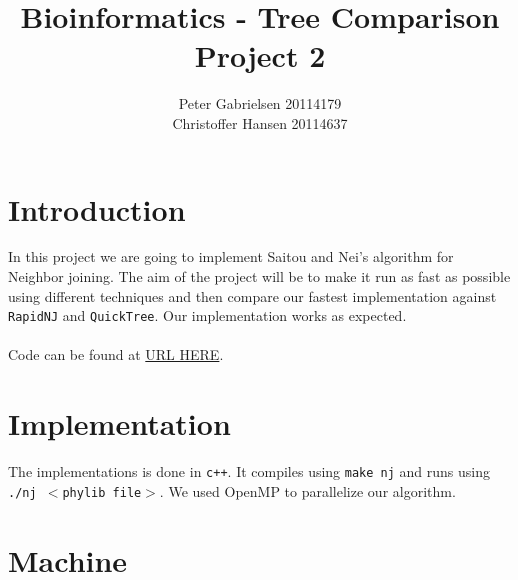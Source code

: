 \documentclass[a4paper,oneside,article,11pt]{memoir}
\title{Bioinformatics - Tree Comparison \\ Project 2}
\author{Peter Gabrielsen 20114179\\
Christoffer Hansen 20114637}
\begin{document}
\maketitle

\chapter*{Introduction}
In this project we are going to implement Saitou and Nei's algorithm for Neighbor joining. The aim of the project will be to make it run as fast as possible using different techniques and then compare our fastest implementation against \texttt{RapidNJ} and \texttt{QuickTree}.
Our implementation works as expected.
\\\\Code can be found at \url{URL HERE}. %

\pagebreak

\chapter*{Implementation}
The implementations is done in \texttt{c++}. It compiles using \texttt{make nj} and runs using \texttt{./nj $<$phylib file$>$}.
We used OpenMP to parallelize our algorithm.

\chapter*{Machine}
\end{document}
